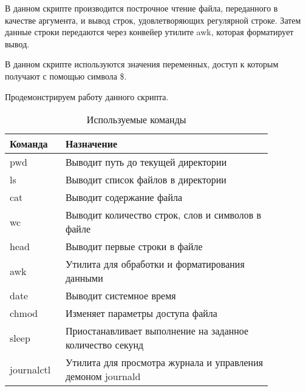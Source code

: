 \documentclass[a4paper,14pt]{extarticle}
\begin{document}
В данном скрипте производится построчное чтение файла, переданного в качестве аргумента, и вывод строк, удовлетворяющих регулярной строке. Затем данные строки передаются через конвейер утилите awk, которая форматирует вывод. 

В данном скрипте используются значения переменных, доступ к которым получают с помощью символа \$. 

Продемонстрируем работу данного скрипта. 




\begin{table}[h!]
	\small
	\centering
	\label{tab:commands}
	\caption{Используемые команды}
	\begin{tabular}{|p{0.16\linewidth}|p{0.7\linewidth}|}
		\hline
		\textbf{Команда} & \textbf{Назначение} \\\hline
		pwd & Выводит путь до текущей директории \\\hline
		ls & Выводит список файлов в директории \\\hline
		cat & Выводит содержание файла \\\hline
		wc & Выводит количество строк,  слов и символов в файле \\\hline
		head & Выводит первые строки в файле \\\hline
		awk & Утилита для обработки и форматирования данными \\\hline
		date & Выводит системное время \\\hline
		chmod & Изменяет параметры доступа файла \\\hline
		sleep & Приостанавливает выполнение на заданное количество секунд \\\hline 
		journalctl & Утилита для просмотра журнала и управления демоном journald \\\hline
	\end{tabular}
\end{table}
\clearpage
\end{document}

